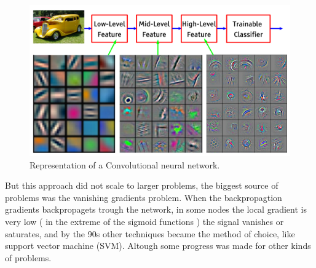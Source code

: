 \documentclass[12pt, a4paper, titlepage,twoside,openright]{article}
\begin{document}
\begin{figure}[H]
\centering         
\includegraphics[width=12cm]{intro/model.png}
\caption{Representation of a Convolutional neural network.} \label{intro1}
\end{figure}



But this approach did not scale to larger problems, the biggest source of problems was the vanishing gradients problem. When the backpropagtion gradients backpropagets trough the network, in some nodes the local gradient is very low ( in the extreme of the sigmoid functions ) the signal vanishes or saturates, and by the 90s other techniques became the method of choice, like support vector machine (SVM). Altough some progress was made for other kinds of problems.
\end{document}
